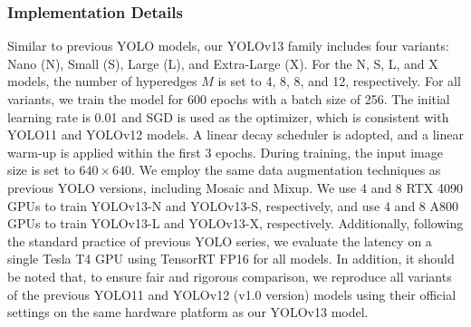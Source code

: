 \subsubsection{Implementation Details}
Similar to previous YOLO models, our YOLOv13 family includes four variants: Nano (N), Small (S), Large (L), and Extra-Large (X). For the N, S, L, and X models, the number of hyperedges $M$ is set to 4, 8, 8, and 12, respectively. For all variants, we train the model for 600 epochs with a batch size of 256. The initial learning rate is 0.01 and SGD is used as the optimizer, which is consistent with YOLO11 and YOLOv12 models. A linear decay scheduler is adopted, and a linear warm‐up is applied within the first 3 epochs. During training, the input image size is set to \(640 \times 640\). We employ the same data augmentation techniques as previous YOLO versions, including Mosaic and Mixup. 
We use 4 and 8 RTX 4090 GPUs to train YOLOv13-N and YOLOv13-S, respectively, and use 4 and 8 A800 GPUs to train YOLOv13-L and YOLOv13-X, respectively.
Additionally, following the standard practice of previous YOLO series, we evaluate the latency on a single Tesla T4 GPU using TensorRT FP16 for all models. 
In addition, it should be noted that, to ensure fair and rigorous comparison, we reproduce all variants of the previous YOLO11 and YOLOv12 (v1.0 version) models using their official settings on the same hardware platform as our YOLOv13 model.


